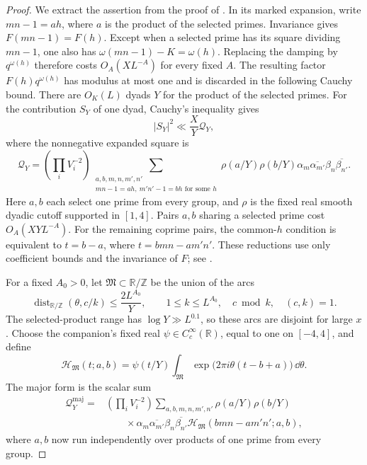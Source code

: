 \begin{proof}
We extract the assertion from the proof of
\cite[Theorem~3.1]{PoissonDirichlet}.  In its marked expansion, write
\(mn-1=ah\), where \(a\) is the product of the selected primes.
Invariance gives \(F(mn-1)=F(h)\).  Except when a selected prime has
its square dividing \(mn-1\), one also has
\(\omega(mn-1)-K=\omega(h)\).  Replacing the damping by
\(q^{\omega(h)}\) therefore costs \(O_A(XL^{-A})\) for every fixed
\(A\).  The resulting factor \(F(h)q^{\omega(h)}\) has modulus at
most one and is discarded in the following Cauchy bound.  There are \(O_K(L)\) dyads
\(Y\) for the product of the selected primes.  For the contribution
\(S_Y\) of one dyad, Cauchy's inequality gives
\[
 |S_Y|^2\ll\frac XY\mathcal Q_Y,
\]
where the nonnegative expanded square is
\begin{equation}\label{eq:type-ii-cauchy-square}
 \mathcal Q_Y=\left(\prod_iV_i^{-2}\right)
 \sum_{\substack{a,b,m,n,m',n'\\
        mn-1=ah,\ m'n'-1=bh\text{ for some }h}}
 \rho(a/Y)\rho(b/Y)\alpha_m\overline{\alpha_{m'}}
                         \beta_n\overline{\beta_{n'}}.
\end{equation}
Here \(a,b\) each select one prime from every group, and \(\rho\) is
the fixed real smooth dyadic cutoff supported in \([1,4]\).
Pairs \(a,b\) sharing a selected prime cost \(O_A(XYL^{-A})\).
For the remaining coprime pairs, the common-\(h\) condition is
equivalent to \(t=b-a\), where \(t=bmn-am'n'\).
These reductions use only coefficient bounds and the invariance of
\(F\); see \cite[Section~3.1]{PoissonDirichlet}.

For a fixed \(A_0>0\), let \(\mathfrak M\subset\mathbb R/\mathbb Z\)
be the union of the arcs
\[
 \operatorname{dist}_{\mathbb R/\mathbb Z}(\theta,c/k)
       \le\frac{2L^{A_0}}Y,\qquad
 1\le k\le L^{A_0},\quad c\bmod k,\quad (c,k)=1.
\]
The selected-product range has \(\log Y\gg L^{0.1}\), so these arcs
are disjoint for large \(x\).
Choose the companion's fixed real \(\psi\in C_c^\infty(\mathbb R)\),
equal to one on \([-4,4]\), and define
\[
 \mathcal H_{\mathfrak M}(t;a,b)
 =\psi(t/Y)\int_{\mathfrak M}
       \exp\bigl(2\pi i\theta(t-b+a)\bigr)\,\dd\theta.
\]
The major form is the scalar sum
\begin{equation}\label{eq:type-ii-major-form}
 \begin{split}
 \mathcal Q_Y^{\mathrm{maj}}
 ={}&\left(\prod_iV_i^{-2}\right)
 \sum_{a,b,m,n,m',n'}
 \rho(a/Y)\rho(b/Y)\\
 &\qquad{}\times\alpha_m\overline{\alpha_{m'}}
                         \beta_n\overline{\beta_{n'}}
 \mathcal H_{\mathfrak M}(bmn-am'n';a,b),
 \end{split}
\end{equation}
where \(a,b\) now run independently over products of one prime from
every group.


\end{proof}
